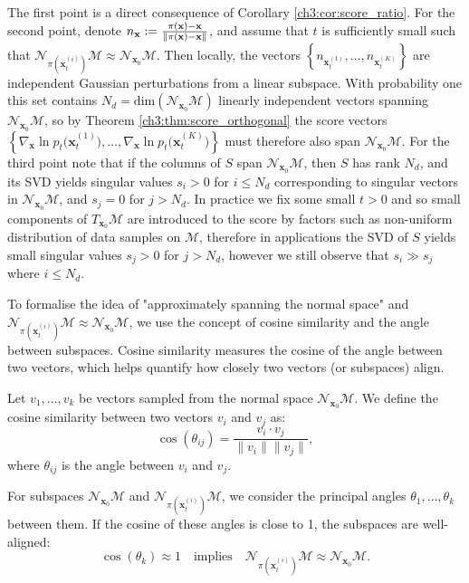 The first point is a direct consequence of Corollary \ref{ch3:cor:score_ratio}. For the second point, denote $n_\textbf{x}:=\frac{\pi(\textbf{x})-\textbf{x}}{\left\lVert \pi(\textbf{x})-\textbf{x} \right\rVert}$, and assume that $t$ is sufficiently small such that $\mathcal{N}_{\pi(\textbf{x}_t^{(i)})}\mathcal{M} \approx \mathcal{N}_{\textbf{x}_0}\mathcal{M}$. Then locally, the vectors $\left\{n_{\textbf{x}_t^{(1)}},\dots,n_{\textbf{x}_t^{(K)}} \right\}$ are independent Gaussian perturbations from a linear subspace. With probability one this set contains $N_d = \text{dim}(\mathcal{N}_{\textbf{x}_0}\mathcal{M})$ linearly independent vectors spanning $\mathcal{N}_{\textbf{x}_0}\mathcal{M}$, so by Theorem \ref{ch3:thm:score_orthogonal} the score vectors  $\left\{ \nabla_{\textbf{x}} \ln p_t\big(\textbf{x}_t^{(1)}\big),\dots, \nabla_{\textbf{x}} \ln p_t\big(\textbf{x}_t^{(K)}\big) \right\}$ must therefore also span $\mathcal{N}_{\textbf{x}_0}\mathcal{M}$. For the third point note that if the columns of $S$ span $\mathcal{N}_{\textbf{x}_0}\mathcal{M}$, then $S$ has rank $N_d$, and its SVD yields singular values $s_i>0$ for $i\leq N_d$ corresponding to singular vectors in $\mathcal{N}_{\textbf{x}_0}\mathcal{M}$, and $s_j=0$ for $j>N_d$. In practice we fix some small $t>0$ and so small components of $T_{\textbf{x}_0}\mathcal{M}$ are introduced to the score by factors such as non-uniform distribution of data samples on $\mathcal{M}$, therefore in applications the SVD of $S$ yields small singular values $s_j>0$ for $j>N_d$, however we still observe that $s_i \gg s_j$ where $i \leq N_d$.

To formalise the idea of "approximately spanning the normal space" and $\mathcal{N}_{\pi(\textbf{x}_t^{(i)})}\mathcal{M} \approx \mathcal{N}_{\textbf{x}_0}\mathcal{M}$, we use the concept of cosine similarity and the angle between subspaces. Cosine similarity measures the cosine of the angle between two vectors, which helps quantify how closely two vectors (or subspaces) align.

Let \( v_1, \ldots, v_k \) be vectors sampled from the normal space \(\mathcal{N}_{\textbf{x}_0}\mathcal{M}\). We define the cosine similarity between two vectors \( v_i \) and \( v_j \) as:
\[ \cos(\theta_{ij}) = \frac{v_i \cdot v_j}{\|v_i\| \|v_j\|}, \]
where \(\theta_{ij}\) is the angle between \( v_i \) and \( v_j \).

For subspaces \(\mathcal{N}_{\textbf{x}_0}\mathcal{M}\) and \(\mathcal{N}_{\pi(\textbf{x}_t^{(i)})}\mathcal{M}\), we consider the principal angles \(\theta_1, \ldots, \theta_k\) between them. If the cosine of these angles is close to 1, the subspaces are well-aligned:
\[ \cos(\theta_k) \approx 1 \quad \text{implies} \quad \mathcal{N}_{\pi(\textbf{x}_t^{(i)})}\mathcal{M} \approx \mathcal{N}_{\textbf{x}_0}\mathcal{M}. \]

